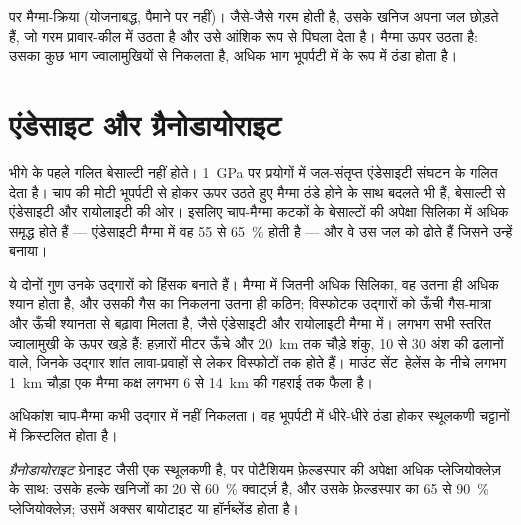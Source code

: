 \begin{omfigure}
{\small {} पर मैग्मा-क्रिया (योजनाबद्ध, पैमाने पर नहीं)। जैसे-जैसे 
गरम होती है, उसके खनिज अपना जल छोड़ते हैं, जो गरम प्रावार-कील में
उठता है और उसे आंशिक रूप से पिघला देता है। मैग्मा ऊपर उठता है: उसका कुछ भाग
ज्वालामुखियों से निकलता है, अधिक भाग भूपर्पटी में  के रूप में ठंडा होता है।}
\end{omfigure}

\section{एंडेसाइट और ग्रैनोडायोराइट}

भीगे  के पहले गलित बेसाल्टी नहीं होते।
\qty{1}{GPa} पर प्रयोगों में जल-संतृप्त  एंडेसाइटी
संघटन के गलित देता है। चाप की मोटी भूपर्पटी से होकर ऊपर उठते हुए मैग्मा ठंडे होने के साथ
बदलते भी हैं, बेसाल्टी से एंडेसाइटी और रायोलाइटी की ओर। इसलिए चाप-मैग्मा
कटकों के बेसाल्टों की अपेक्षा सिलिका में अधिक समृद्ध होते हैं --- एंडेसाइटी मैग्मा
में वह 55 से \qty{65}{\percent} होती है --- और वे उस जल को ढोते हैं जिसने उन्हें
बनाया।

ये दोनों गुण उनके उद्गारों को हिंसक बनाते हैं। मैग्मा में जितनी अधिक सिलिका,
वह उतना ही अधिक श्यान होता है, और उसकी गैस का निकलना उतना ही कठिन; विस्फोटक
उद्गारों को ऊँची गैस-मात्रा और ऊँची श्यानता से बढ़ावा मिलता है, जैसे
एंडेसाइटी और रायोलाइटी मैग्मा में। लगभग सभी स्तरित ज्वालामुखी
 के ऊपर खड़े हैं: हज़ारों मीटर ऊँचे और \qty{20}{km} तक
चौड़े शंकु, 10 से 30 अंश की ढलानों वाले, जिनके उद्गार शांत
लावा-प्रवाहों से लेकर विस्फोटों तक होते हैं। माउंट सेंट~हेलेंस के नीचे लगभग \qty{1}{km} चौड़ा एक मैग्मा कक्ष
लगभग 6 से \qty{14}{km} की गहराई तक फैला है।

अधिकांश चाप-मैग्मा कभी उद्गार में नहीं निकलता। वह भूपर्पटी में धीरे-धीरे ठंडा होकर
स्थूलकणी चट्टानों में क्रिस्टलित होता है।

\begin{definition}[ग्रैनोडायोराइट]\label{def:g12:subduction-magmatism:granodiorite}
\emph{ग्रैनोडायोराइट} ग्रेनाइट जैसी एक स्थूलकणी  है,
पर पोटैशियम फ़ेल्डस्पार की अपेक्षा अधिक प्लेजियोक्लेज़ के साथ: उसके हल्के खनिजों का 20 से
\qty{60}{\percent} क्वार्ट्ज़ है, और उसके फ़ेल्डस्पार का 65 से
\qty{90}{\percent} प्लेजियोक्लेज़; उसमें अक्सर बायोटाइट
या हॉर्नब्लेंड होता है।
\end{definition}

